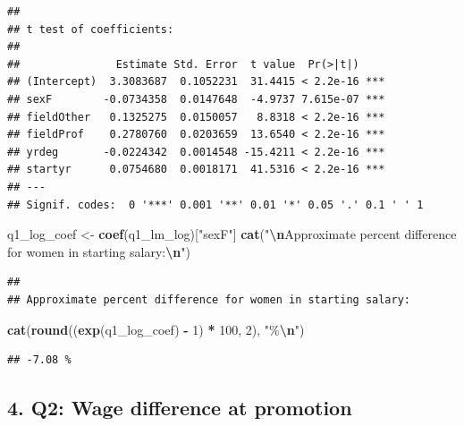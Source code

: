\documentclass[
]{article}
\newenvironment{Shaded}{\begin{snugshade}}{\end{snugshade}}
\newcommand{\DecValTok}[1]{\textcolor[rgb]{0.00,0.00,0.81}{#1}}
\newcommand{\FunctionTok}[1]{\textcolor[rgb]{0.13,0.29,0.53}{\textbf{#1}}}
\newcommand{\NormalTok}[1]{#1}
\newcommand{\OtherTok}[1]{\textcolor[rgb]{0.56,0.35,0.01}{#1}}
\newcommand{\SpecialCharTok}[1]{\textcolor[rgb]{0.81,0.36,0.00}{\textbf{#1}}}
\newcommand{\StringTok}[1]{\textcolor[rgb]{0.31,0.60,0.02}{#1}}
\begin{document}
\begin{verbatim}
## 
## t test of coefficients:
## 
##               Estimate Std. Error  t value  Pr(>|t|)    
## (Intercept)  3.3083687  0.1052231  31.4415 < 2.2e-16 ***
## sexF        -0.0734358  0.0147648  -4.9737 7.615e-07 ***
## fieldOther   0.1325275  0.0150057   8.8318 < 2.2e-16 ***
## fieldProf    0.2780760  0.0203659  13.6540 < 2.2e-16 ***
## yrdeg       -0.0224342  0.0014548 -15.4211 < 2.2e-16 ***
## startyr      0.0754680  0.0018171  41.5316 < 2.2e-16 ***
## ---
## Signif. codes:  0 '***' 0.001 '**' 0.01 '*' 0.05 '.' 0.1 ' ' 1
\end{verbatim}

\begin{Shaded}
\begin{Highlighting}[]
\NormalTok{q1\_log\_coef }\OtherTok{\textless{}{-}} \FunctionTok{coef}\NormalTok{(q1\_lm\_log)[}\StringTok{"sexF"}\NormalTok{]}
\FunctionTok{cat}\NormalTok{(}\StringTok{"}\SpecialCharTok{\textbackslash{}n}\StringTok{Approximate percent difference for women in starting salary:}\SpecialCharTok{\textbackslash{}n}\StringTok{"}\NormalTok{)}
\end{Highlighting}
\end{Shaded}

\begin{verbatim}
## 
## Approximate percent difference for women in starting salary:
\end{verbatim}

\begin{Shaded}
\begin{Highlighting}[]
\FunctionTok{cat}\NormalTok{(}\FunctionTok{round}\NormalTok{((}\FunctionTok{exp}\NormalTok{(q1\_log\_coef) }\SpecialCharTok{{-}} \DecValTok{1}\NormalTok{) }\SpecialCharTok{*} \DecValTok{100}\NormalTok{, }\DecValTok{2}\NormalTok{), }\StringTok{"\%}\SpecialCharTok{\textbackslash{}n}\StringTok{"}\NormalTok{)}
\end{Highlighting}
\end{Shaded}

\begin{verbatim}
## -7.08 %
\end{verbatim}

\subsection{4. Q2: Wage difference at
promotion}\label{q2-wage-difference-at-promotion}
\end{document}
